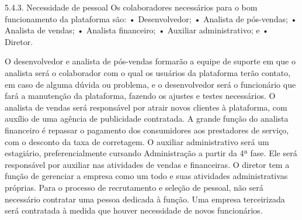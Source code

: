 5.4.3. Necessidade de pessoal 
Os colaboradores necessários para o bom funcionamento da plataforma são: 
•	Desenvolvedor; 
•	Analista de pós-vendas; 
•	Analista de vendas; 
•	Analista financeiro; • Auxiliar administrativo; e 
•	Diretor. 

O desenvolvedor e analista de pós-vendas formarão a equipe de suporte em que o analista será o colaborador com o qual os usuários da plataforma terão contato, em caso de alguma dúvida ou problema, e o desenvolvedor será o funcionário que fará a manutenção da plataforma, fazendo os ajustes e testes necessários. 
O analista de vendas será responsável por atrair novos clientes à plataforma, com auxílio de uma agência de publicidade contratada. 
A grande função do analista financeiro é repassar o pagamento dos consumidores aos prestadores de serviço, com o desconto da taxa de corretagem. 
O auxiliar administrativo será um estagiário, preferencialmente cursando Administração a partir da 4ª fase. Ele será responsável por auxiliar nas atividades de vendas e financeiras. 
O diretor tem a função de gerenciar a empresa como um todo e suas atividades administrativas próprias. 
Para o processo de recrutamento e seleção de pessoal, não será necessário contratar uma pessoa dedicada à função. Uma empresa terceirizada será contratada à medida que houver necessidade de novos funcionários. 

